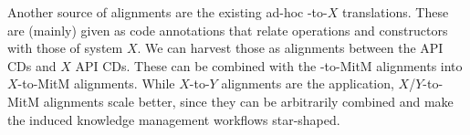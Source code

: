 Another source of alignments are the existing ad-hoc \Sage-to-$X$ translations. These are
(mainly) given as \Sage code annotations that relate \Sage operations and constructors
with those of system $X$. We can harvest those as alignments between the \Sage API CDs and
$X$ API CDs. These can be combined with the \Sage-to-MitM alignments into $X$-to-MitM
alignments. While $X$-to-$Y$ alignments are the application, $X$/$Y$-to-MitM alignments
scale better, since they can be arbitrarily combined and make the induced knowledge
management workflows star-shaped.



